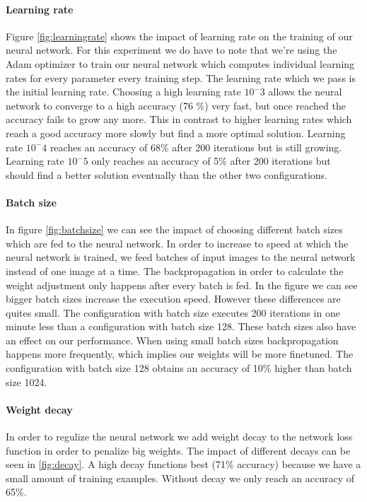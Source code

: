 \documentclass{article}
\begin{document}
\paragraph{Learning rate}
Figure \ref{fig:learningrate} shows the impact of learning rate on the training of our neural network. 
For this experiment we do have to note that we're using the Adam optimizer to train our neural network which computes individual learning rates for every parameter every training step. The learning rate which we pass is the initial learning rate. Choosing a high learning rate $10^-3$ allows the neural network to converge to a high accuracy (76 \%) very fast, but once reached the accuracy fails to grow any more.
This in contrast to higher learning rates which reach a good accuracy more slowly but find a more optimal solution. Learning rate $10^-4$ reaches an accuracy of 68\% after 200 iterations but is still growing. Learning rate $10^-5$ only reaches an accuracy of 5\% after 200 iterations but should find a better solution eventually than the other two configurations. 
\paragraph{Batch size}
In figure \ref{fig:batchsize} we can see the impact of choosing different batch sizes which are fed to the neural network. In order to increase to speed at which the neural network is trained, we feed batches of input images to the neural network instead of one image at a time. The backpropagation in order to calculate the weight adjustment only happens after every batch is fed. In the figure we can see bigger batch sizes increase the execution speed. However these differences are quites small. The configuration with batch size executes 200 iterations in one minute less than a configuration with batch size 128. These batch sizes also have an effect on our performance. When using small batch sizes backpropagation happens more frequently, which implies our weights will be more finetuned. The configuration with batch size 128 obtains an accuracy of 10\% higher than batch size 1024.
\paragraph{Weight decay}
In order to regulize the neural network we add weight decay to the network loss function in order to penalize big weights. The impact of different decays can be seen in \ref{fig:decay}. A high decay functions best (71\% accuracy) because we have a small amount of training examples. Without decay we only reach an accuracy of 65\%. 
\end{document}

